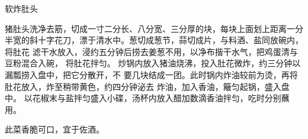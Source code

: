 \begin{recipe}{软炸肚头}

\ingredients


\preparation

\step 猪肚头洗净去筋，切成一寸二分长、八分宽、三分厚的块，每块上面划上距离一分
半宽的斜十字花刀，漂于清水中。葱切成葱节，蒜切成片，与料酒、盐同放碗内，将肚花
滤干水放入，浸约五分钟后捞去姜葱不用，以净布揩干水气，把鸡蛋清与豆粉混合入碗，
将肚花拌匀。
\step 炒锅内放入猪油烧沸，投入肚花微炸，约三分钟以漏瓢捞入盘中，把它分散开，不
要几块结成一团。此时锅内炸油较前为烫，再将肚花放入，炸至稍带黄色，约四分钟泌去
炸油，加入香油，簸匀起锅，盛入盘中。
\step 以花椒末与盐拌匀盛入小碟，汤杯内放入醋加数滴香油拌匀，吃时分别蘸用。

\features

此菜香脆可口，宜于佐酒。

\end{recipe}

